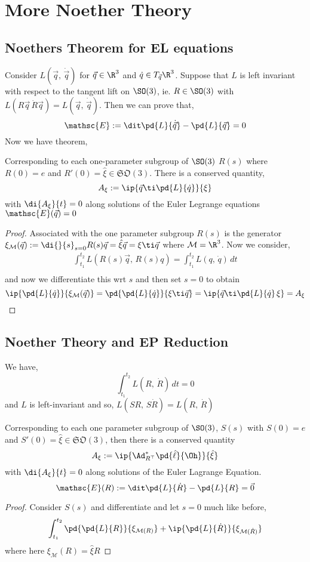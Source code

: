 
\section{More Noether Theory}

\subsection{Noethers Theorem for EL equations}

Consider $L(\vec q,\, \dot \vec q)$ for $\vec q \in \R^3$ and $\dot q \in T_{\vec q}\R^3$. Suppose that $L$ is left invariant with respect to the tangent lift on $\SO(3)$, ie. $R\in\SO(3)$ with $L(R\vec q\,\dot R\vec q) = L(\vec q,\,\dot\vec q)$. Then we can prove that,
$$ \mathsc{E} := \dit \pd{L}{\dot{\vec q}} - \pd{L}{\vec q} = 0 $$
Now we have theorem,
\begin{nthm}
  Corresponding to each one-parameter subgroup of $\SO(3)$ $R(s)$ where $R(0) = e$ and $R'(0) = \hat\xi \in \mathfrak{SO}(3)$. There is a conserved quantity,
  $$ A_\xi := \ip{\vec q \ti \pd{L}{\dot q}}{\xi} $$
  with $\di{A_\xi}{t} = 0$ along solutions of the Euler Legrange equations $\mathsc{E}(\vec q) = 0$
\end{nthm}
\begin{proof}
  Associated with the one parameter subgroup $R(s)$ is the generator $\xi_{\mathcal{M}}(\vec q) := \di{}{s}_{s=0} R(s)\vec q = \hat\xi \vec q = \xi\ti\vec q$ where $\mathcal{M} = \R^3$. Now we consider,
  \begin{align*}
    \int_{t_1}^{t_2} L(R(s)\vec q,\,R(s)q) = \int_{t_1}^{t_2} L(q,\,\dot q) \,dt \\
  \end{align*}
  and now we differentiate this wrt $s$ and then set $s = 0$ to obtain
  $$ \ip{\pd{L}{\dot q}}{\xi_{\mathcal{M}}(\vec q)} = \pd{\pd{L}{\dot q}}{\xi \ti \vec q} = \ip{\vec q \ti \pd{L}{\dot q}\,\xi} = A_\xi$$
\end{proof}

\subsection{Noether Theory and EP Reduction}
We have,
$$ \int_{t_1}^{t_2} L(R,\,\dot R)\,dt = 0 $$
and $L$ is left-invariant and so, $L(SR,\,S\dot R) = L(R,\,\dot R)$
\begin{nthm}
  Corresponding to each one parameter subgroup of $\SO(3)$, $S(s)$ with $S(0)= e$ and $S'(0) = \hat\xi \in \mathfrak{SO}(3)$, then there is a conserved quantity
  $$ A_\xi := \ip{\Ad^*_{R^\top}\pd{\hat\ell}{\Oh}}{\hat\xi} $$
  with $\di{A_\xi}{t} = 0$ along solutions of the Euler Lagrange Equation.
  $$ \mathsc{E}(R) := \dit\pd{L}{\dot R} - \pd{L}{R} = \vec 0 $$
\end{nthm}
\begin{proof}
  Consider $S(s)$ and differentiate and let $s = 0$ much like before,
  $$ \int_{t_1}^{t_2} \pd{\pd{L}{R}}{\xi_{\mathcal{M}(R)}} + \ip{\pd{L}{\dot R}}{\xi_{\mathcal{M}(\dot R)}} $$
  where here $\xi_{\mathcal{M}}(R) = \hat\xi R$
\end{proof}


